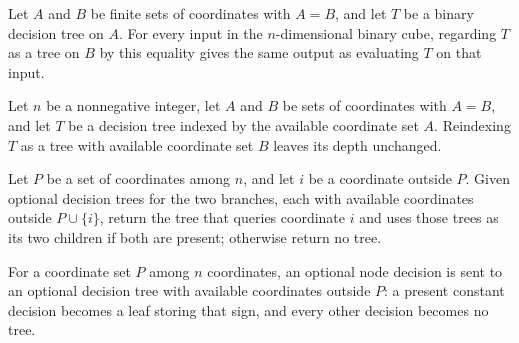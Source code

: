 \begin{theorem}
\leanok
{}
Let $A$ and $B$ be finite sets of coordinates with $A=B$, and let $T$ be a binary
decision tree on $A$. For every input in the $n$-dimensional binary cube, regarding $T$
as a tree on $B$ by this equality gives the same output as evaluating $T$ on that input.
\end{theorem}

\begin{theorem}
\leanok
{}
Let $n$ be a nonnegative integer, let $A$ and $B$ be sets of coordinates with $A=B$, and
let $T$ be a decision tree indexed by the available coordinate set $A$. Reindexing $T$
as a tree with available coordinate set $B$ leaves its depth unchanged.
\end{theorem}

\begin{definition}
\label{FABL.assembleJuntaQuery}
\leanok
{}
Let $P$ be a set of coordinates among $n$, and let $i$ be a coordinate outside $P$.
Given optional decision trees for the two branches, each with available coordinates
outside $P\cup\{i\}$, return the tree that queries coordinate $i$ and uses those trees
as its two children if both are present; otherwise return no tree.
\end{definition}

\begin{definition}
\label{FABL.juntaNodeLeafOutput}
\leanok
{}
For a coordinate set $P$ among $n$ coordinates, an optional node decision is sent to an
optional decision tree with available coordinates outside $P$: a present constant
decision becomes a leaf storing that sign, and every other decision becomes no tree.
\end{definition}

